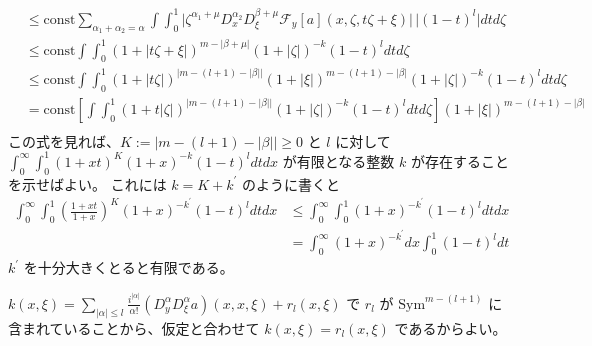\begin{Proof}
\begin{align*}
    &\leq \text{const} \sum_{\alpha_1 + \alpha_2 = \alpha} \int \int_0^1 \lvert \zeta^{\alpha_1 + \mu} D^{\alpha_2}_x D^{\beta + \mu}_\xi \mathscr{F}_y[a](x , \zeta , t \zeta + \xi) \rvert \, \lvert (1 - t)^l \rvert dt d\zeta \\
    &\leq \text{const} \int \int_0^1 (1 + \lvert t \zeta + \xi \rvert)^{m - \lvert \beta + \mu \rvert} (1 + \lvert \zeta \rvert)^{-k} (1 - t)^l dt d\zeta \\
    &\leq \text{const} \int \int_0^1 (1 + \lvert t \zeta \rvert)^{\lvert m - (l + 1) - \lvert \beta \rvert \rvert} (1 + \lvert \xi \rvert)^{m - (l + 1) - \lvert \beta \rvert} (1 + \lvert \zeta \rvert)^{-k} (1 - t)^l dt d\zeta \\
    &= \text{const} \left[\int \int_0^1 (1 + t \lvert \zeta \rvert)^{\lvert m - (l + 1) - \lvert \beta \rvert \rvert} (1 + \lvert \zeta \rvert)^{-k} (1 - t)^l dt d\zeta \right] (1 + \lvert \xi \rvert)^{m - (l + 1) - \lvert \beta \rvert} \\
  \end{align*}
  この式を見れば、\(K := \lvert m - (l + 1) - \lvert \beta \rvert \rvert \geq 0\) と \(l\) に対して \(\int_0^\infty \int_0^1 (1 + x t)^{K} (1 + x)^{-k} (1 - t)^{l} dt dx\) が有限となる整数 \(k\) が存在することを示せばよい。
  これには \(k = K + k^\prime\) のように書くと
  \begin{align*}
    \int_0^\infty \int_0^1 \left(\frac{1 + x t}{1 + x}\right)^{K} (1 + x)^{-k^\prime} (1 - t)^l dt dx
    &\leq \int_0^\infty \int_0^1 (1 + x)^{-k^\prime} (1 - t)^l dt dx \\
    &= \int_0^\infty (1 + x)^{-k^\prime} dx \int_0^1 (1 - t)^l dt
  \end{align*}
  \(k^\prime\) を十分大きくとると有限である。
\end{Proof}

\begin{Proof}
\itemprof
  \(k(x,\xi) = \sum_{\lvert \alpha \rvert \leq l} \frac{i^{\lvert \alpha \rvert}}{\alpha !} (D^\alpha_y D^\alpha_\xi a)(x,x,\xi) + r_l(x,\xi)\) で \(r_l\) が \(\text{Sym}^{m-(l+1)}\) に含まれていることから、仮定と合わせて \(k(x,\xi) = r_l(x,\xi)\) であるからよい。
\end{Proof}